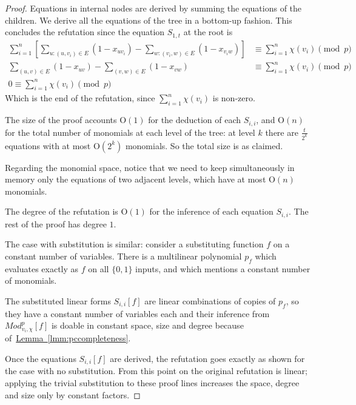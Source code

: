 \documentclass[11pt]{article}
\numberwithin{equation}{section}
\theoremstyle{definition}
\theoremstyle{plain}
\newcommand{\expref}[2]{\hyperref[#2]{#1~\ref{#2}}}
\theoremstyle{plain}
\theoremstyle{definition}
\newcommand{\reflem}[1]{\expref{Lemma}{#1}}
\newcommand{\bigoh}[1]{\mathrm{O} ( #1 )}
\newcommand{\formulaformat}[1]{\mathit{#1}}
\newcommand{\substform}[2]{{#1}[{#2}]}
\newcommand{\tseitinmodpflow}[2]{\ensuremath{\formulaformat{Mod}^{p}_{#1,#2}}}
\newcommand{\tseitincharge}{\chi}
\begin{document}
\begin{proof}
  Equations in internal nodes are derived by summing the
  equations of the children. We derive all the equations of the tree
  in a bottom-up fashion. This concludes the refutation since the
  equation $S_{1,t}$ at the root is
  \begin{align}
    \sum^{n}_{i=1}
    \left[
    \sum_{u:(u,v_{i})\in E} (1-x_{uv_{i}}) -\sum_{w:(v_{i},w)\in E} (1-x_{v_{i}w})
    \right]
    & \equiv \sum^{n}_{i=1} \tseitincharge(v_{i}) \pmod{p}
    \\
    \sum_{(u,v)\in E} (1-x_{uv}) -\sum_{(v,w)\in E} (1-x_{vw})
    & \equiv \sum^{n}_{i=1} \tseitincharge(v_{i}) \pmod{p}\\
    0 \equiv \sum^{n}_{i=1} \tseitincharge(v_{i}) \pmod{p}
  \end{align}
  Which is the end of the refutation, since $\sum^{n}_{i=1} \tseitincharge(v_{i})$
  is non-zero.

  The size of the proof accounts $\bigoh{1}$ for the deduction of each $S_{i,i}$, and $\bigoh{n}$ for the total number of monomials at each level of the tree: at level $k$ there are $\frac{t}{2^{k}}$ equations with at most  $\bigoh{2^{k}}$ monomials. So the total size is as claimed.

  Regarding the monomial space, notice that we need to keep simultaneously in memory only the equations of two adjacent levels, which have at most $\bigoh{n}$ monomials.

  The degree of the refutation is $\bigoh{1}$ for the inference of each equation $S_{i,i}$. The rest of the proof has degree $1$.

  The case with substitution is similar: consider a substituting
  function $f$ on a constant number of variables. There is a
  multilinear polynomial $p_{f}$ which evaluates exactly as $f$ on all
  $\{0,1\}$ inputs, and which mentions a constant number of monomials.

  The substituted linear forms $\substform{S_{i,i}}{f}$ are linear
  combinations of copies of $p_{f}$, so they have a constant
  number of variables each and their inference from
  $\substform{\tseitinmodpflow{v_{i}}{\tseitincharge}}{f}$ is doable in constant
  space, size and degree because of~\reflem{lmm:pccompleteness}.

  Once the equations $\substform{S_{i,i}}{f}$ are derived, the
  refutation goes exactly as shown for the case with no
  substitution. From this point on the original refutation is linear;
  applying the trivial substitution to these proof lines increases the
  space, degree and size only by constant factors.
\end{proof}
\end{document}
